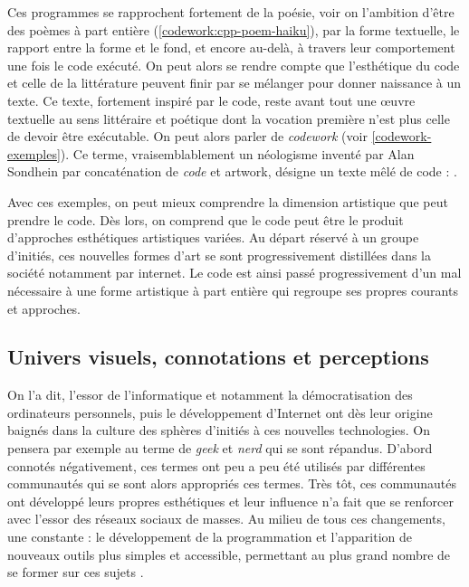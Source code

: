 \documentclass[12pt]{article} %
\begin{document}
Ces programmes se rapprochent fortement de la poésie, voir on l'ambition d'être des poèmes à part entière (\ref{codework:cpp-poem-haiku}), par la forme textuelle, le rapport entre la forme et le fond, et encore au-delà, à travers leur comportement une fois le code exécuté. On peut alors se rendre compte que l'esthétique du code et celle de la littérature peuvent finir par se mélanger pour donner naissance à un texte. Ce texte, fortement inspiré par le code, reste avant tout une œuvre textuelle au sens littéraire et poétique dont la vocation première n'est plus celle de devoir être exécutable. On peut alors parler de \textit{codework} \label{codework} (voir \ref{codework-exemples}). Ce terme, vraisemblablement un néologisme inventé par Alan Sondhein par concaténation de \textit{code} et {artwork}, désigne un texte mêlé de code :  \cite{ELO-ContentByKeyword}. 

Avec ces exemples, on peut mieux comprendre la dimension artistique que peut prendre le code. Dès lors, on comprend que le code peut être le produit d'approches esthétiques artistiques variées. Au départ réservé à un groupe d'initiés, ces nouvelles formes d'art se sont progressivement distillées dans la société notamment par internet. Le code est ainsi passé progressivement d'un mal nécessaire à une forme artistique à part entière qui regroupe ses propres courants et approches.

\subsection{Univers visuels, connotations et perceptions}
On l'a dit, l'essor de l'informatique et notamment la démocratisation des ordinateurs personnels, puis le développement d'Internet ont dès leur origine baignés dans la culture des sphères d'initiés à ces nouvelles technologies. On pensera par exemple au terme de \textit{geek} et \textit{nerd} qui se sont répandus. D'abord connotés négativement, ces termes ont peu a peu été utilisés par différentes communautés qui se sont alors appropriés ces termes. Très tôt, ces communautés ont développé leurs propres esthétiques et leur influence n'a fait que se renforcer avec l'essor des réseaux sociaux de masses. Au milieu de tous ces changements, une constante : le développement de la programmation et l'apparition de nouveaux outils plus simples et accessible, permettant au plus grand nombre de se former sur ces sujets \cite{Dijkstra1976}.
\end{document}
